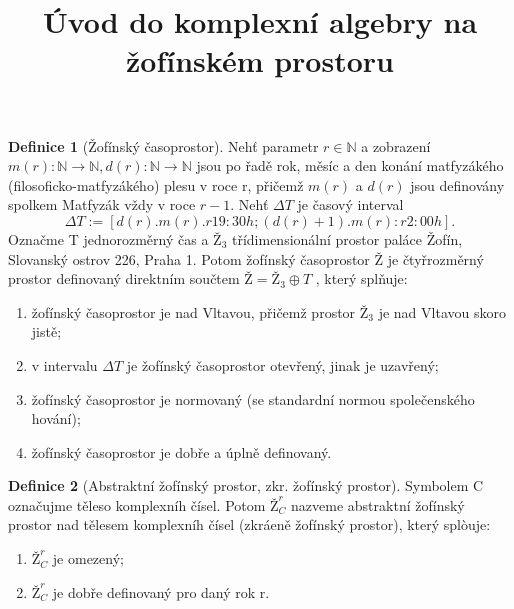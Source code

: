 \documentclass[12pt,a4paper]{article}
\title{Úvod do komplexní algebry na žofínském prostoru}
\date{}
\begin{document}
\maketitle


\textbf{Definice 1}
(Žofínský časoprostor).
Nehť parametr $r \in \mathds{N}$ a zobrazení
$m(r) : \mathds{N} \rightarrow \mathds{N},d(r) : \mathds{N} \rightarrow \mathds{N}$
jsou po řadě rok, měsíc a den konání matfyzákého (filosoficko-matfyzákého)
plesu v roce r, přičemž $m(r)$ a $d(r)$ jsou definovány spolkem Matfyzák vždy v roce $r - 1$.
Nehť $\Delta T$ je časový interval
$$
\Delta T := [d(r). m(r). r 19:30 h; (d(r) + 1). m(r): r 2:00 h].
$$
Označme T jednorozměrný čas a $Ž_3$ třídimensionální prostor paláce Žofín, Slovanský ostrov 226, Praha 1. Potom žofínský časoprostor $Ž$ je čtyřrozměrný prostor definovaný
direktním součtem $Ž = Ž_3 \oplus T$ , který splňuje:\\
\begin{enumerate}
\item žofínský časoprostor je nad Vltavou, přičemž prostor $Ž_3$ je nad Vltavou skoro jistě;
\item v intervalu $\Delta T$ je žofínský časoprostor otevřený, jinak je uzavřený;
\item žofínský časoprostor je normovaný (se standardní normou společenského hování);
\item žofínský časoprostor je dobře a úplně definovaný.
\end{enumerate}


\textbf{Definice 2}
(Abstraktní žofínský prostor, zkr. žofínský prostor).
Symbolem C označujme těleso komplexníh čísel. Potom $Ž_{C}^r$ nazveme
abstraktní žofínský prostor nad tělesem komplexníh čísel
(zkráeně žofínský prostor), který splòuje:
\begin{enumerate}
\item $ Ž_C^r$ je omezený;
\item $Ž_C^r$ je dobře definovaný pro daný rok r.
\end{enumerate}
\end{document}
